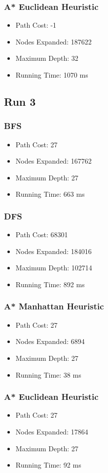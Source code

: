 \documentclass{article}
\begin{document}
		\subsubsection{A* Euclidean Heuristic}
			\begin{itemize}
				\item Path Cost: -1
				\item Nodes Expanded: 187622
				\item Maximum Depth: 32
				\item Running Time: 1070 ms
			\end{itemize}
	\subsection{Run 3}
		\begin{center}
		   \end{center}
		\subsubsection{BFS}
			\begin{itemize}
				\item Path Cost: 27
				\item Nodes Expanded: 167762
				\item Maximum Depth: 27
				\item Running Time: 663 ms
			\end{itemize}
		\subsubsection{DFS}
			\begin{itemize}
				\item Path Cost: 68301
				\item Nodes Expanded: 184016
				\item Maximum Depth: 102714
				\item Running Time: 892 ms
			\end{itemize}
		\subsubsection{A* Manhattan Heuristic}
			\begin{itemize}
				\item Path Cost: 27
				\item Nodes Expanded: 6894
				\item Maximum Depth: 27
				\item Running Time: 38 ms
			\end{itemize}
		\subsubsection{A* Euclidean Heuristic}
			\begin{itemize}
				\item Path Cost: 27
				\item Nodes Expanded: 17864
				\item Maximum Depth: 27
				\item Running Time: 92 ms
			\end{itemize}
\end{document}
